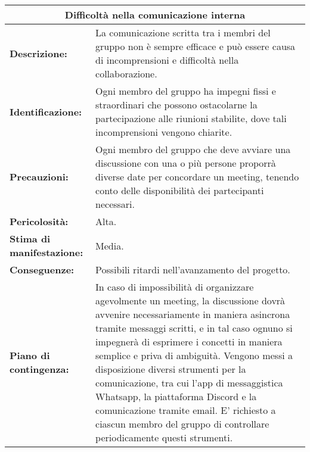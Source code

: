 \renewcommand\tabularxcolumn[1]{>{\Centering}m{#1}}
\begin{tabularx}{\textwidth}{ |X|X|}
\hline
\multicolumn{2}{|c|}{\textbf{Difficoltà nella comunicazione interna}} \\
\hline
\textbf{Descrizione:}& La comunicazione scritta tra i membri del gruppo non è sempre efficace e può essere causa di incomprensioni e difficoltà nella collaborazione. \\
\hline
\textbf{Identificazione:}& Ogni membro del gruppo ha impegni fissi e straordinari che possono ostacolarne la partecipazione alle riunioni stabilite, dove tali incomprensioni vengono chiarite. \\
\hline
\textbf{Precauzioni:}& Ogni membro del gruppo che deve avviare una discussione con una o più persone proporrà diverse date per concordare un meeting, tenendo conto delle disponibilità dei partecipanti necessari. \\
\hline
\textbf{Pericolosità:}& Alta.\\
\hline
\textbf{Stima di manifestazione:}& Media.\\
\hline
\textbf{Conseguenze:}& Possibili ritardi nell'avanzamento del progetto.\\
\hline
\textbf{Piano di contingenza:}& In caso di impossibilità di organizzare agevolmente un meeting, la discussione dovrà avvenire necessariamente in maniera asincrona tramite messaggi scritti, e in tal caso ognuno si impegnerà di esprimere i concetti in maniera semplice e priva di ambiguità. Vengono messi a disposizione diversi strumenti per la comunicazione, tra cui l'app di messaggistica Whatsapp, la piattaforma Discord e la comunicazione tramite email. E' richiesto a ciascun membro del gruppo di controllare periodicamente questi strumenti. \\
\hline
\end{tabularx}

\vspace{20pt}

